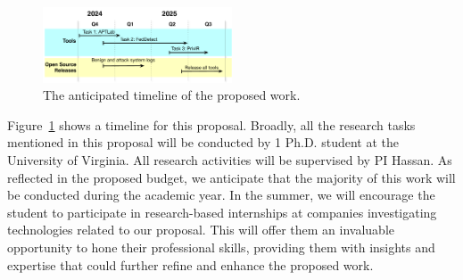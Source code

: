 
\begin{figure}
  \centering \includegraphics[width=0.50\textwidth]{fig/timeline.pdf}
  \caption{The anticipated timeline of the proposed work.}
  \label{fig:sched}
  \vspace{-1ex}
\end{figure}


Figure~\ref{fig:sched} shows a timeline for this proposal. Broadly, all the research tasks mentioned in this proposal will be conducted by 1 Ph.D. student at the University of Virginia. All research activities will be supervised by PI Hassan. As reflected in the proposed budget, we anticipate that the majority of this work will be conducted during the academic year. In the summer, we will encourage the student to participate in research-based internships at companies investigating technologies related to our proposal. This will offer them an invaluable opportunity to hone their professional skills, providing them with insights and expertise that could further refine and enhance the proposed work.